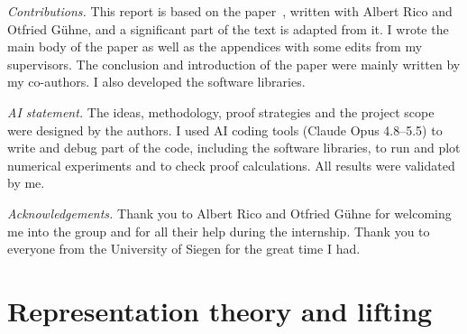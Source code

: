 \documentclass[11pt,a4paper]{report}
\DeclareMathOperator{\spec}{spec}
\newcommand{\one}{\mathds{1}}
\newcommand{\I}{\one}
\newcounter{reptag}
\newif\iftags \tagsfalse   %
\newcommand{\reptagbox}[3]{\iftags\par\smallskip\noindent\refstepcounter{reptag}%
  \fcolorbox{#1}{#1!7}{\parbox{\dimexpr\linewidth-2\fboxsep-2\fboxrule\relax}{\small
  \textcolor{#1}{\textbf{[\thereptag]\ #2.}}\ #3}}\par\smallskip\fi}
\newcommand{\deeper}[1]{\reptagbox{tagP}{Deeper proof}{#1}}
\begin{document}
\bigskip
{\em Contributions.} This report is based on the paper~\cite{ourPaper}, written with Albert Rico and Otfried G\"uhne, and a significant part of the text is adapted from it. I wrote the main body of the paper as well as the appendices with some edits from my supervisors. The conclusion and introduction of the paper were mainly written by my co-authors. I also developed the software libraries.

{\em AI statement.} The ideas, methodology, proof strategies and the project scope were designed by the authors. I used AI coding tools (Claude Opus 4.8--5.5) to write and debug part of the code, including the software libraries, to run and plot numerical experiments and to check proof calculations. All results were validated by me.

{\em Acknowledgements.} Thank you to Albert Rico and Otfried G\"uhne for welcoming me into the group and for all their help during the internship. Thank you to everyone from the University of Siegen for the great time I had.
\appendix

\chapter{Representation theory and lifting}\label{app:repTheory}
\deeper{Derive the isotypic projector of Eq.~\eqref{eq:isotypic} from the orthogonality of characters (it is the central idempotent of the group algebra) and show that the $\Pi^\lambda$ are orthogonal projectors summing to the identity. Commutation with $g^{\otimes k}$ follows from Eq.~\eqref{eq:PerUniCommute} in one line; write it.}
\deeper{Prove the weak Schur sampling formula $\tr(\Pi^\lambda\rho_A^{\otimes k})=f^\lambda s_\lambda(\spec\rho_A)$: by unitary invariance take $\rho_A$ diagonal; on $\mathcal S^\lambda_k\otimes\mathcal U^\lambda_d$ the operator $\rho_A^{\otimes k}$ acts as $\I_{f^\lambda}\otimes q_\lambda(\rho_A)$, and the character of the $GL_d$ irrep at a diagonal matrix is the Schur polynomial. Check it by hand at $k=2$: $\tr(\Pi^{(2)}\rho^{\otimes2})=(1+\tr\rho^2)/2=s_{(2)}$.}
\end{document}
